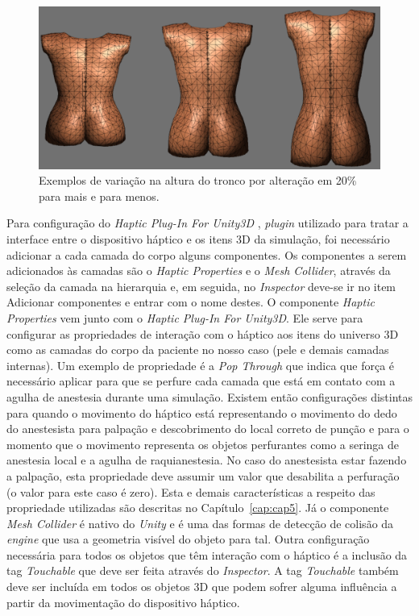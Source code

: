 \begin{figure}[ht!]
    \centering
    \includegraphics[width=0.9\linewidth]{capitulos/figuras/alteracao-modelo-altura.png} 
    \caption{Exemplos de variação na altura do tronco por alteração em 20\% para mais e para menos.}
    \label{fig:alteracaoModeloAltura}
\end{figure}

Para configuração do \textit{Haptic Plug-In For Unity3D} \cite{Poyade2014}, \textit{plugin} utilizado para tratar a interface entre o dispositivo háptico e os itens 3D da simulação, foi necessário adicionar a cada camada do corpo alguns componentes. Os componentes a serem adicionados às camadas são o \textit{Haptic Properties} e o \textit{Mesh Collider}, através da seleção da camada na hierarquia e, em seguida, no \textit{Inspector} deve-se ir no item Adicionar componentes e entrar com o nome destes. O componente \textit{Haptic Properties} vem junto com o \textit{Haptic Plug-In For Unity3D}. Ele serve para configurar as propriedades de interação com o háptico aos itens do universo 3D como as camadas do corpo da paciente no nosso caso (pele e demais camadas internas). Um exemplo de propriedade é a \textit{Pop Through} que indica que força é necessário aplicar para que se perfure cada camada que está em contato com a agulha de anestesia durante uma simulação. Existem então configurações distintas para quando o movimento do háptico está representando o movimento do dedo do anestesista para palpação e descobrimento do local correto de punção e para o momento que o movimento representa os objetos perfurantes como a seringa de anestesia local e a agulha de raquianestesia. No caso do anestesista estar fazendo a palpação, esta propriedade deve assumir um valor que desabilita a perfuração (o valor para este caso é zero). Esta e demais características a respeito das propriedade utilizadas são descritas no Capítulo~\ref{cap:cap5}. Já o componente \textit{Mesh Collider} é nativo do \textit{Unity} e é uma das formas de detecção de colisão da \textit{engine} que usa a geometria visível do objeto para tal. Outra configuração necessária para todos os objetos que têm interação com o háptico é a inclusão da tag \textit{Touchable} que deve ser feita através do \textit{Inspector}. A tag \textit{Touchable} também deve ser incluída em todos os objetos 3D que podem sofrer alguma influência a partir da movimentação do dispositivo háptico.


